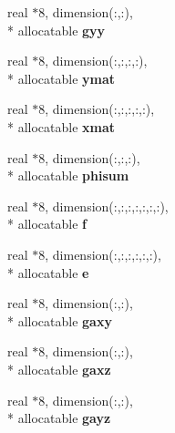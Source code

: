 \begin{DoxyCompactItemize}
\item 
\hypertarget{classsolvar_ac7df8e2a82dab471c01b1c0d712bc1ef}{real $\ast$8, dimension(\+:,\+:), \\*
allocatable {\bfseries gyy}}\label{classsolvar_ac7df8e2a82dab471c01b1c0d712bc1ef}

\item 
\hypertarget{classsolvar_a16fa15c5f7e227b9f8c61a21c77a1a41}{real $\ast$8, dimension(\+:,\+:,\+:,\+:), \\*
allocatable {\bfseries ymat}}\label{classsolvar_a16fa15c5f7e227b9f8c61a21c77a1a41}

\item 
\hypertarget{classsolvar_a400d15edae35ea1f710d2ce77c877d9f}{real $\ast$8, dimension(\+:,\+:,\+:,\+:,\+:), \\*
allocatable {\bfseries xmat}}\label{classsolvar_a400d15edae35ea1f710d2ce77c877d9f}

\item 
\hypertarget{classsolvar_a4fa52ac9570d75a9b4b16dd4e6f05bfb}{real $\ast$8, dimension(\+:,\+:,\+:), \\*
allocatable {\bfseries phisum}}\label{classsolvar_a4fa52ac9570d75a9b4b16dd4e6f05bfb}

\item 
\hypertarget{classsolvar_a62f998c492fd360b6e8da38df9886ea4}{real $\ast$8, dimension(\+:,\+:,\+:,\+:,\+:,\+:,\+:), \\*
allocatable {\bfseries f}}\label{classsolvar_a62f998c492fd360b6e8da38df9886ea4}

\item 
\hypertarget{classsolvar_a14015d8fd97c9e2fad831a5cb056f6d0}{real $\ast$8, dimension(\+:,\+:,\+:,\+:,\+:,\+:), \\*
allocatable {\bfseries e}}\label{classsolvar_a14015d8fd97c9e2fad831a5cb056f6d0}

\item 
\hypertarget{classsolvar_a7997639550cc940fdc84298e057c4325}{real $\ast$8, dimension(\+:,\+:), \\*
allocatable {\bfseries gaxy}}\label{classsolvar_a7997639550cc940fdc84298e057c4325}

\item 
\hypertarget{classsolvar_ab854fafbcf9337a86f37e3df3bcc755a}{real $\ast$8, dimension(\+:,\+:), \\*
allocatable {\bfseries gaxz}}\label{classsolvar_ab854fafbcf9337a86f37e3df3bcc755a}

\item 
\hypertarget{classsolvar_aa4dc92c9b94a2b4d6aecf0eb83c18504}{real $\ast$8, dimension(\+:,\+:), \\*
allocatable {\bfseries gayz}}\label{classsolvar_aa4dc92c9b94a2b4d6aecf0eb83c18504}


\end{DoxyCompactItemize}
